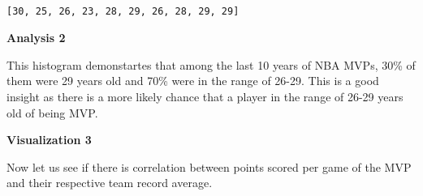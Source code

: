 \documentclass[11pt]{article}
\begin{document}
    \begin{center}
    \end{center}
    { \hspace*{\fill} \\}
    
    \begin{Verbatim}[commandchars=\\\{\}]
[30, 25, 26, 23, 28, 29, 26, 28, 29, 29]

    \end{Verbatim}

    \textbf{Analysis 2} \newline

This histogram demonstartes that among the last 10 years of NBA MVPs,
30\% of them were 29 years old and 70\% were in the range of 26-29. This
is a good insight as there is a more likely chance that a player in the
range of 26-29 years old of being MVP. \newline
\newline

\textbf{Visualization 3} \newline

Now let us see if there is correlation between points scored per game of
the MVP and their respective team record average.
\end{document}
